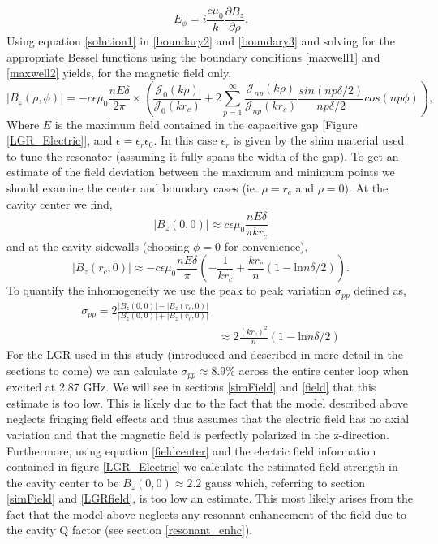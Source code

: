\begin{equation}\label{boundary3}
E_{\phi} =  i \frac{ c \mu_0}{k}\frac{\partial B_z}{\partial \rho}.
\end{equation}
Using equation \ref{solution1} in \ref{boundary2} and \ref{boundary3} and solving for the appropriate Bessel functions using the boundary conditions \ref{maxwell1} and \ref{maxwell2} yields, for the magnetic field only,
\begin{equation}
|B_z(\rho,\phi)| = - c \epsilon\mu_0 \frac{n E \delta}{2\pi} \times \left(\frac{\mathcal{J}_0(k\rho)}{\mathcal{J}_0(k r_c)} + 2 \sum\limits_{p = 1}^{\infty} \frac{\mathcal{J}_{np}(k \rho)}{\mathcal{J}_{n p} (k r_c)} \frac{sin(np\delta/2)}{np\delta/2}cos(np\phi)\right),
\end{equation}
Where $E$ is the maximum field contained in the capacitive gap [Figure \ref{LGR_Electric}], and $\epsilon = \epsilon_r\epsilon_0$. In this case $\epsilon_r$ is given by the shim material used to tune the resonator (assuming it fully spans the width of the gap). To get an estimate of the field deviation between the maximum and minimum points we should examine the center and boundary cases (ie. $\rho = r_c$ and $\rho = 0$). At the cavity center we find,
\begin{equation} \label{fieldcenter}
|B_z(0,0)| \approx c \epsilon\mu_0 \frac{nE\delta}{\pi k r_c}
\end{equation}
and at the cavity sidewalls (choosing $\phi = 0$ for convenience),
\begin{equation}
|B_z(r_c,0)| \approx -c\epsilon\mu_0 \frac{nE \delta}{\pi} \left(-\frac{1}{k r_c}+ \frac{k r_c}{n}(1-\text{ln} n\delta/2)\right).
\end{equation}
To quantify the inhomogeneity we use the peak to peak variation $\sigma_{pp}$ defined as,
\begin{equation} \label{homogeneity}
\begin{split}
\sigma_{pp} = 2\frac{|B_z(0,0)| - |B_z(r_c,0)|}{|B_z(0,0)| + |B_z(r_c,0)|} \\
& \approx 2\frac{(kr_c)^2}{n}(1-\text{ln}n\delta/2)
\end{split}
\end{equation}
For the LGR used in this study (introduced and described in more detail in the sections to come) we can calculate $\sigma_{pp} \approx 8.9\%$ across the entire center loop when excited at 2.87 GHz. We will see in sections \ref{simField} and \ref{field} that this estimate is too low. This is likely due to the fact that the model described above neglects fringing field effects and thus assumes that the electric field has no axial variation and that the magnetic field is perfectly polarized in the z-direction. Furthermore, using equation \ref{fieldcenter} and the electric field information contained in figure \ref{LGR_Electric} we calculate the estimated field strength in the cavity center to be $B_z(0,0) \approx 2.2$ gauss which, referring to section \ref{simField} and \ref{LGRfield}, is too low an estimate. This most likely arises from the fact that the model above neglects any resonant enhancement of the field due to the cavity Q factor (see section \ref{resonant_enhc}).
